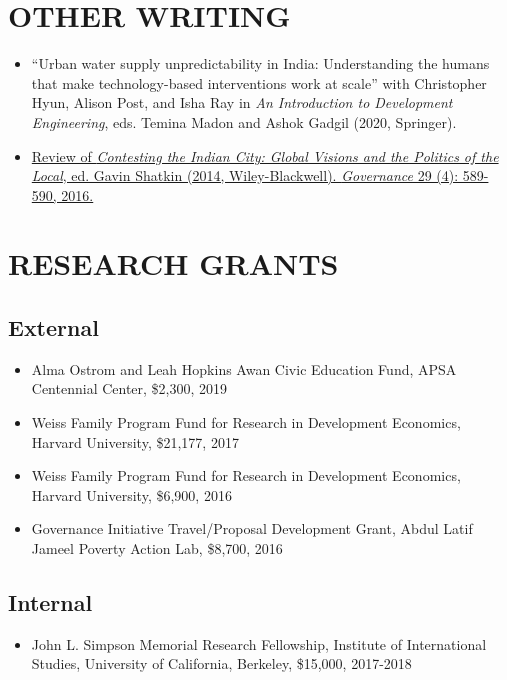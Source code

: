 \documentclass[11pt]{article}
\begin{document}
\section*{OTHER WRITING}
\begin{itemize}
\item[]``Urban water supply unpredictability in India: Understanding the humans that make technology-based interventions work at scale'' with Christopher Hyun, Alison Post, and Isha Ray in \textit{An Introduction to Development Engineering}, eds. Temina Madon and Ashok Gadgil (2020, Springer). 
\item[] \href{http://onlinelibrary.wiley.com/doi/10.1111/gove.12241/abstract}{Review of \textit{Contesting the Indian City: Global Visions and the Politics of the Local}, ed. Gavin Shatkin (2014, Wiley-Blackwell). \textit{Governance} 29 (4): 589-590, 2016.} \
\end{itemize}


\vspace{3mm}
\section*{RESEARCH GRANTS}
\subsection*{External}
\begin{itemize}
\item[]Alma Ostrom and Leah Hopkins Awan Civic Education Fund, APSA Centennial Center, \$2,300, 2019

\item[] Weiss Family Program Fund for Research in Development Economics, Harvard University, \$21,177, 2017
\item[] Weiss Family Program Fund for Research in Development Economics, Harvard University, \$6,900, 2016
\item[] Governance Initiative Travel/Proposal Development Grant, Abdul Latif Jameel Poverty Action Lab, \$8,700, 2016	
	 
\end{itemize}

\subsection*{Internal}
\begin{itemize}
\item[]John L. Simpson Memorial Research Fellowship, Institute of International Studies, University of California, Berkeley, \$15,000, 2017-2018
\end{itemize}
\end{document}
